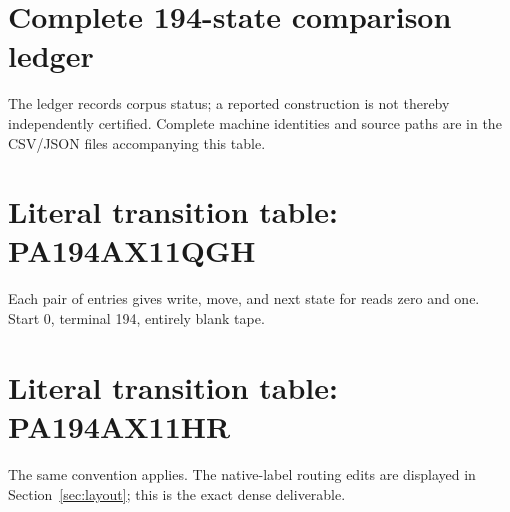 \documentclass[11pt,letterpaper]{article}
\begin{document}
\clearpage\appendix
\section{Complete 194-state comparison ledger}
The ledger records corpus status; a reported construction is not thereby
independently certified. Complete machine identities and source paths are
in the CSV/JSON files accompanying this table.


\clearpage


\clearpage
\section{Literal transition table: PA194AX11QGH}
Each pair of entries gives write, move, and next state for reads zero and
one. Start 0, terminal 194, entirely blank tape.


\clearpage
\section{Literal transition table: PA194AX11HR}
The same convention applies. The native-label routing edits are displayed
in Section~\ref{sec:layout}; this is the exact dense deliverable.

\end{document}
